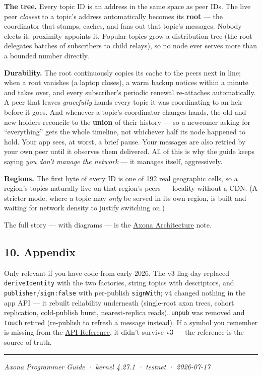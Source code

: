 \documentclass[
  nobib]{tufte-handout}
\renewcommand{\subsubsection}[1]{\medskip\par\noindent{\normalsize\bfseries #1}\par\nobreak\smallskip}
\begin{document}
\textbf{The tree.} Every topic ID is an address in the same space as
peer IDs. The live peer \emph{closest} to a topic's address
automatically becomes its \textbf{root} --- the coordinator that stamps,
caches, and fans out that topic's messages. Nobody elects it; proximity
appoints it. Popular topics grow a distribution tree (the root delegates
batches of subscribers to child relays), so no node ever serves more
than a bounded number directly.

\textbf{Durability.} The root continuously copies its cache to the peers
next in line; when a root vanishes (a laptop closes), a warm backup
notices within a minute and takes over, and every subscriber's periodic
renewal re-attaches automatically. A peer that leaves \emph{gracefully}
hands every topic it was coordinating to an heir before it goes. And
whenever a topic's coordinator changes hands, the old and new holders
reconcile to the \textbf{union} of their history --- so a newcomer
asking for ``everything'' gets the whole timeline, not whichever half
its node happened to hold. Your app sees, at worst, a brief pause. Your
messages are also retried by your own peer until it observes them
delivered. All of this is why the guide keeps saying \emph{you don't
manage the network} --- it manages itself, aggressively.

\textbf{Regions.} The first byte of every ID is one of 192 real
geographic cells, so a region's topics naturally live on that region's
peers --- locality without a CDN. (A stricter mode, where a topic may
\emph{only} be served in its own region, is built and waiting for
network density to justify switching on.)

The full story --- with diagrams --- is the
\href{../architecture/Axona-Architecture.tex}{Axona Architecture} note.

\subsection{10. Appendix}\label{appendix}

\subsubsection{Migrating from the v2/v3
lines}\label{migrating-from-the-v2v3-lines}

Only relevant if you have code from early 2026. The v3 flag-day replaced
\texttt{deriveIdentity} with the two factories, string topics with
descriptors, and \texttt{publisher}/\texttt{sign:false} with per-publish
\texttt{signWith}; v4 changed nothing in the app API --- it rebuilt
reliability underneath (single-root axon trees, cohort replication,
cold-publish burst, nearest-replica reads). \texttt{unpub} was removed
and \texttt{touch} retired (re-publish to refresh a message instead). If
a symbol you remember is missing from the
\href{Axona-API-Reference-v4.27.1.md}{API Reference}, it didn't survive
v3 --- the reference is the source of truth.

\begin{center}\rule{0.5\linewidth}{0.5pt}\end{center}

\emph{Axona Programmer Guide · kernel 4.27.1 · testnet · 2026-07-17}
\end{document}
